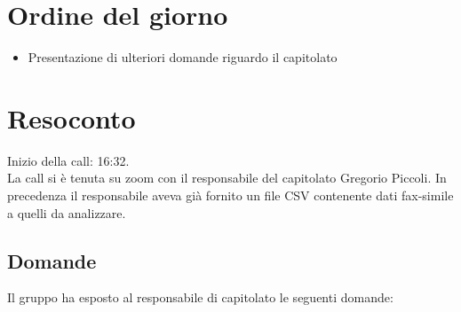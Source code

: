 \section{Ordine del giorno}

\begin{itemize}
	\item Presentazione di ulteriori domande riguardo il capitolato
\end{itemize}

\section{Resoconto}

\noindent 
Inizio della call: 16:32.\\
\noindent La call si è tenuta su zoom con il responsabile del capitolato Gregorio Piccoli. In precedenza il responsabile aveva già fornito un file CSV contenente dati fax-simile a quelli da analizzare.

\subsection{Domande}
Il gruppo ha esposto al responsabile di capitolato le seguenti domande:

